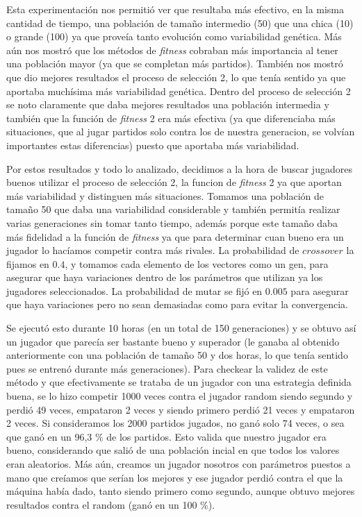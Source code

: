 \documentclass[A4paper,oneside,fleqn,11pt]{article}
\theoremstyle{definition}
\begin{document}
Esta experimentación nos permitió ver que resultaba más efectivo, en la misma cantidad de tiempo, una población de tamaño intermedio (50) que una chica (10) o grande (100) ya que proveía tanto evolución como variabilidad genética. Más aún nos mostró que los métodos de \textit{fitness} cobraban más importancia al tener una población mayor (ya que se completan más partidos). También nos mostró que dio mejores resultados el proceso de selección 2, lo que tenía sentido ya que aportaba muchísima más variabilidad genética. Dentro del proceso de selección 2 se noto claramente que daba mejores resultados una población intermedia y también que la función de \textit{fitness} 2 era más efectiva (ya que diferenciaba más situaciones, que al jugar partidos solo contra los de nuestra generacion, se volvían importantes estas diferencias) puesto que aportaba más variabilidad.

Por estos resultados y todo lo analizado, decidimos a la hora de buscar jugadores buenos utilizar el proceso de selección 2, la funcion de \textit{fitness} 2 ya que aportan más variabilidad y distinguen más situaciones. Tomamos una población de tamaño 50 que daba una variabilidad considerable y también permitía realizar varias generaciones sin tomar tanto tiempo, además porque este tamaño daba más fidelidad a la función de \textit{fitness} ya que para determinar cuan bueno era un jugador lo hacíamos competir contra más rivales. La probabilidad de $crossover$ la fijamos en $0.4$, y tomamos cada elemento de los vectores como un gen, para asegurar que haya variaciones dentro de los parámetros que utilizan ya los jugadores seleccionados. La probabilidad de mutar se fijó en $0.005$ para asegurar que haya variaciones pero no sean demasiadas como para evitar la convergencia.

Se ejecutó esto durante 10 horas (en un total de 150 generaciones) y se obtuvo así un jugador que parecía ser bastante bueno y superador (le ganaba al obtenido anteriormente con una población de tamaño 50 y dos horas, lo que tenía sentido pues se entrenó durante más generaciones). Para checkear la validez de este método y que efectivamente se trataba de un jugador con una estrategia definida buena, se lo hizo competir 1000 veces contra el jugador random siendo segundo y perdió 49 veces, empataron 2 veces y siendo primero perdió 21 veces y empataron 2 veces. Si consideramos los 2000 partidos jugados, no ganó solo 74 veces, o sea que ganó en un 96,3 \% de los partidos. Esto valida que nuestro jugador era bueno, considerando que salió de una población incial en que todos los valores eran aleatorios. Más aún, creamos un jugador nosotros con parámetros puestos a mano que creíamos que serían los mejores y ese jugador perdió contra el que la máquina había dado, tanto siendo primero como segundo, aunque obtuvo mejores resultados contra el random (ganó en un 100 \%).
\end{document}
